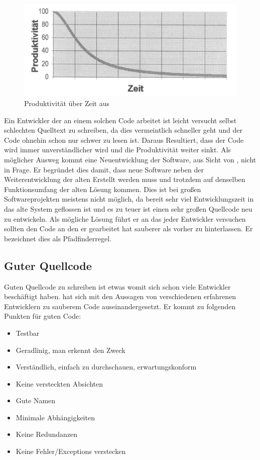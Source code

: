 \begin{figure}[H]
	\centering
	\includegraphics[width=\textwidth]{poduktivitaet.jpg}
	\caption{Produktivität über Zeit aus \cite[S. 29]{Martin}}
	\label{grundlagen:produktivitaet}
\end{figure}

Ein Entwickler der an einem solchen Code arbeitet ist leicht versucht selbst schlechten Quelltext zu schreiben, da dies vermeintlich schneller geht und der Code ohnehin schon nur schwer zu lesen ist. Daraus Resultiert, dass der Code wird immer unverständlicher wird und die Produktivität weiter sinkt.
Als möglicher Ausweg kommt eine Neuentwicklung der Software, aus Sicht von \cite[S. 29f.]{Martin}, nicht in Frage.
Er begründet dies damit, dass neue Software neben der Weiterentwicklung der alten Erstellt werden muss und trotzdem auf denselben Funktionsumfang der alten Lösung kommen. Dies ist bei großen Softwareprojekten meistens nicht möglich, da bereit sehr viel Entwicklungszeit in das alte System geflossen ist und es zu teuer ist einen sehr großen Quellcode neu zu entwickeln. Als mögliche Lösung führt er an das jeder Entwickler versuchen sollten den Code an den er gearbeitet hat sauberer als vorher zu hinterlassen. Er bezeichnet dies als Pfadfinderregel.

\subsection{Guter Quellcode}

Guten Quellcode zu schreiben ist etwas womit sich schon viele Entwickler beschäftigt haben\cite{Martin, Green, Spinellis, reed}.
\cite[S. 32f.]{Martin} hat sich mit den Aussagen von verschiedenen erfahrenen Entwicklern zu sauberem Code auseinandergesetzt.
Er kommt zu folgenden Punkten für guten Code:

\begin{itemize}
\item Testbar
\item Geradlinig, man erkennt den Zweck
\item Verständlich, einfach zu durchschauen, erwartungskonform
\item Keine versteckten Absichten
\item Gute Namen
\item Minimale Abhängigkeiten
\item Keine Redundanzen
\item Keine Fehler/Exceptions verstecken
\end{itemize}

